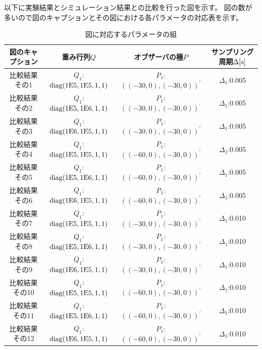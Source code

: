 	以下に実験結果とシミュレーション結果との比較を行った図を示す。
	図の数が多いので図のキャプションとその図における各パラメータの対応表を示す。
	\begin{table}[htb]
		\begin{center}
			\caption{図に対応するパラメータの組}
			\medskip
			
			\begin{tabular}{|c|c|c|c|}\hline
				図のキャプション & 重み行列$Q$ & オブザーバの極$P$ & サンプリング周期$\Delta[\rm{s}]$ \\ \hline\hline
				比較結果その1 & $Q_1$:$\rm{diag}(1E5,1E5,1,1)$ & $P_1$:$((-30,0),(-30,0))^{'}$ & $\Delta_1$:0.005 \\ \hline
				比較結果その2 & $Q_1$:$\rm{diag}(1E5,1E6,1,1)$ & $P_1$:$((-30,0),(-30,0))^{'}$ & $\Delta_1$:0.005 \\ \hline
				比較結果その3 & $Q_1$:$\rm{diag}(1E6,1E5,1,1)$ & $P_1$:$((-30,0),(-30,0))^{'}$ & $\Delta_1$:0.005 \\ \hline
				比較結果その4 & $Q_1$:$\rm{diag}(1E5,1E5,1,1)$ & $P_1$:$((-60,0),(-30,0))^{'}$ & $\Delta_1$:0.005 \\ \hline
				比較結果その5 & $Q_1$:$\rm{diag}(1E5,1E6,1,1)$ & $P_1$:$((-60,0),(-30,0))^{'}$ & $\Delta_1$:0.005 \\ \hline
				比較結果その6 & $Q_1$:$\rm{diag}(1E6,1E5,1,1)$ & $P_1$:$((-60,0),(-30,0))^{'}$ & $\Delta_1$:0.005 \\ \hline
				比較結果その7 & $Q_1$:$\rm{diag}(1E5,1E5,1,1)$ & $P_1$:$((-30,0),(-30,0))^{'}$ & $\Delta_1$:0.010 \\ \hline
				比較結果その8 & $Q_1$:$\rm{diag}(1E5,1E6,1,1)$ & $P_1$:$((-30,0),(-30,0))^{'}$ & $\Delta_1$:0.010 \\ \hline
				比較結果その9 & $Q_1$:$\rm{diag}(1E6,1E5,1,1)$ & $P_1$:$((-30,0),(-30,0))^{'}$ & $\Delta_1$:0.010 \\ \hline
				比較結果その10 & $Q_1$:$\rm{diag}(1E5,1E5,1,1)$ & $P_1$:$((-60,0),(-30,0))^{'}$ & $\Delta_1$:0.010 \\ \hline
				比較結果その11 & $Q_1$:$\rm{diag}(1E5,1E6,1,1)$ & $P_1$:$((-60,0),(-30,0))^{'}$ & $\Delta_1$:0.010 \\ \hline
				比較結果その12 & $Q_1$:$\rm{diag}(1E6,1E5,1,1)$ & $P_1$:$((-60,0),(-30,0))^{'}$ & $\Delta_1$:0.010 \\ \hline
			\end{tabular}
		\end{center}
		\label{table:huriage_control}
	\end{table}
	
